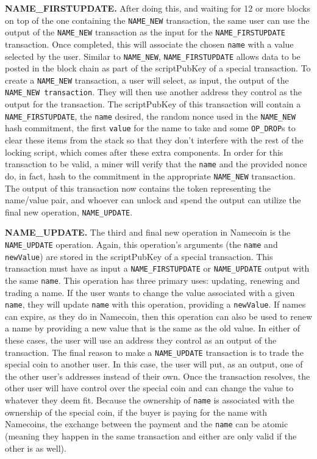 {\bf NAME\_FIRSTUPDATE.}
After doing this, and waiting for 12 or more blocks on top of the one containing the {\tt NAME\_NEW} transaction, the same user can use the output of the {\tt NAME\_NEW} transaction as the input for the {\tt NAME\_FIRSTUPDATE} transaction. Once completed, this will associate the chosen {\tt name} with a value selected by the user. Similar to {\tt NAME\_NEW}, {\tt NAME\_FIRSTUPDATE} allows data to be posted in the block chain as part of the scriptPubKey of a special transaction. 
To create a {\tt NAME\_NEW} transaction, a user will select, as input, the output of the {\tt NAME\_NEW transaction}. They will then use another address they control as the output for the transaction. The scriptPubKey of this transaction will contain a {\tt NAME\_FIRSTUPDATE}, the {\tt name} desired, the random nonce used in the {\tt NAME\_NEW} hash commitment, the first {\tt value} for the name to take and some {\tt OP\_DROP}s to clear these items from the stack so that they don't interfere with the rest of the locking script, which comes after these extra components. In order for this transaction to be valid, a miner will verify that the {\tt name} and the provided nonce do, in fact, hash to the commitment in the appropriate {\tt NAME\_NEW} transaction. The output of this transaction now contains the token representing the name/value pair, and whoever can unlock and spend the output can utilize the final new operation, {\tt NAME\_UPDATE}.

{\bf NAME\_UPDATE.}
The third and final new operation in Namecoin is the {\tt NAME\_UPDATE} operation. Again, this operation's arguments (the {\tt name} and {\tt newValue}) are stored in the scriptPubKey of a special transaction. This transaction must have as input a {\tt NAME\_FIRSTUPDATE} or {\tt NAME\_UPDATE} output with the same {\tt name}. This operation has three primary uses: updating, renewing and trading a name. If the user wants to change the value associated with a given {\tt name}, they will update {\tt name} with this operation, providing a {\tt newValue}. If names can expire, as they do in Namecoin, then this operation can also be used to renew a name by providing a new value that is the same as the old value. In either of these cases, the user will use an address they control as an output of the transaction. The final reason to make a {\tt NAME\_UPDATE} transaction is to trade the special coin to another user. In this case, the user will put, as an output, one of the other user's addresses instead of their own. Once the transaction resolves, the other user will have control over the special coin and can change the value to whatever they deem fit. Because the ownership of {\tt name} is associated with the ownership of the special coin, if the buyer is paying for the name with Namecoins, the exchange between the payment and the {\tt name} can be atomic (meaning they happen in the same transaction and either are only valid if the other is as well). 

